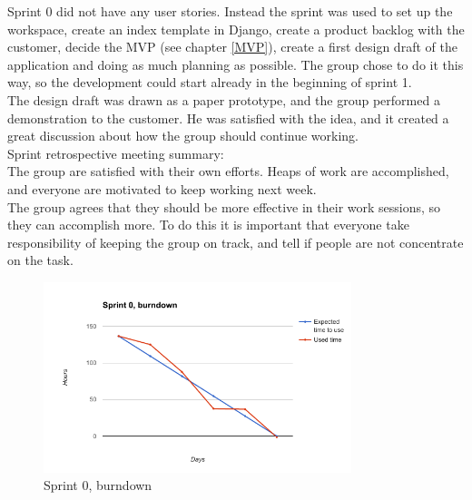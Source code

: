 Sprint 0 did not have any user stories. Instead the sprint was used to set up the workspace, create an index template in Django, create a product backlog with the customer, decide the MVP (see chapter \ref{MVP}), create a first design draft of the application and doing as much planning as possible. The group chose to do it this way, so the development could start already in the beginning of sprint 1. \\

The design draft was drawn as a paper prototype, and the group performed a demonstration to the customer. He was satisfied with the idea, and it created a great discussion about how the group should continue working. \\

Sprint retrospective meeting summary:\\
The group are satisfied with their own efforts. Heaps of work are accomplished, and everyone are motivated to keep working next week. \\
    
The group agrees that they should be more effective in their work sessions, so they can accomplish more. To do this it is important that everyone take responsibility of keeping the group on track, and tell if people are not concentrate on the task.

\begin{figure}[h!]
\centering
    \includegraphics[width=0.8\textwidth]{fig/sprint0}
\caption{Sprint 0, burndown}
\end{figure}



